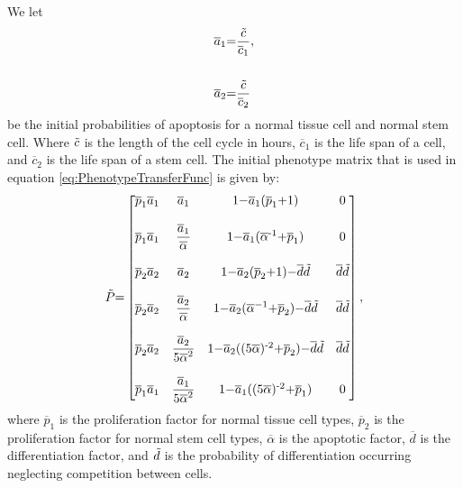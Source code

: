 \documentclass[\main/thesis.tex]{subfiles}
\begin{document}
We let 
\begin{align}
    \overline{a}_1 &{=} \frac{\Tilde{c}}{\overline{c}_1},\\ \nonumber\\
    \overline{a}_2 &{=} \frac{\Tilde{c}}{\overline{c}_2}
    \label{param:initialApoptosis}
\end{align} 
be the initial probabilities of apoptosis for a normal tissue cell and normal stem cell. Where $\Tilde{c}$ is the length of the cell cycle in hours, $\overline{c}_1$ is the life span of a cell, and $\overline{c}_2$ is the life span of a stem cell.
The initial phenotype matrix that is used in equation \eqref{eq:PhenotypeTransferFunc} is given by:
\begin{equation}
    \Tilde{P} {=}
    \begin{bmatrix}
        \overline{p}_1 \overline{a}_1 & \overline{a}_1 & 1 {-} \overline{a}_1 (\overline{p}_1 {+} 1) & 0 \\ \\
        \overline{p}_1 \overline{a}_1 & \displaystyle \frac{\overline{a}_1}{\overline{\alpha}} & 1 {-} \overline{a}_1 (\overline{\alpha}^{\text{-} 1} {+} \overline{p}_1) & 0 \\ \\
        \overline{p}_2 \overline{a}_2 & \overline{a}_2 & 1 {-} \overline{a}_2 (\overline{p}_2 {+} 1) {-} \overline{d} \Tilde{d} & \overline{d} \Tilde{d} \\ \\
        \overline{p}_2 \overline{a}_2 & \displaystyle \frac{\overline{a}_2}{\overline{\alpha}} & 1 {-} \overline{a}_2 (\overline{\alpha}^{-1} {+} \overline{p}_2) {-} \overline{d} \Tilde{d} & \overline{d} \Tilde{d} \\ \\
        \overline{p}_2 \overline{a}_2 & \displaystyle \frac{\overline{a}_2}{5 \overline{\alpha}^2} & 1 {-} \overline{a}_2 ((5\overline{\alpha})^{\text{-} 2} {+} \overline{p}_2) {-} \overline{d} \Tilde{d} & \overline{d} \Tilde{d} \\ \\
        \overline{p}_1 \overline{a}_1 & \displaystyle \frac{\overline{a}_1}{5 \overline{\alpha}^2} & 1 {-} \overline{a}_1 ((5 \overline{\alpha})^{\text{-} 2} {+} \overline{p}_1) & 0
    \end{bmatrix},
    \label{param:initialPhenotype}
\end{equation}
where $\overline{p}_1$ is the proliferation factor for normal tissue cell types, $\overline{p}_2$ is the proliferation factor for normal stem cell types, $\overline{\alpha}$ is the apoptotic factor, $\overline{d}$ is the differentiation factor, and $\Tilde{d}$ is the probability of differentiation occurring neglecting competition between cells. 
\end{document}
